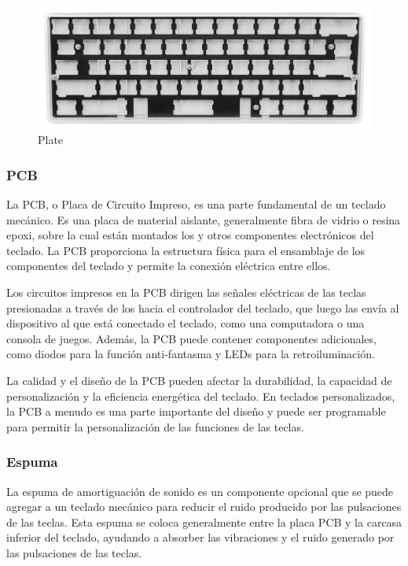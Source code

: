 \begin{figure}[H]
    \centering
    \includegraphics[width=1\textwidth]{imagenes/Capitulos/Cap03/Plate.png}
    \caption{Plate \cite{PlateImageSource}}
    \label{fig:Plate}
\end{figure}

\subsubsection{\gls{PCB}}

La \gls{PCB}, o Placa de Circuito Impreso, es una parte fundamental de un teclado mecánico. Es una placa de material aislante, generalmente fibra de vidrio o resina epoxi, sobre la cual están montados los  y otros componentes electrónicos del teclado. La \gls{PCB} proporciona la estructura física para el ensamblaje de los componentes del teclado y permite la conexión eléctrica entre ellos.

Los circuitos impresos en la \gls{PCB} dirigen las señales eléctricas de las teclas presionadas a través de los  hacia el controlador del teclado, que luego las envía al dispositivo al que está conectado el teclado, como una computadora o una consola de juegos. Además, la \gls{PCB} puede contener componentes adicionales, como diodos para la función anti-fantasma y \gls{LED}s para la retroiluminación.

La calidad y el diseño de la \gls{PCB} pueden afectar la durabilidad, la capacidad de personalización y la eficiencia energética del teclado. En teclados personalizados, la \gls{PCB} a menudo es una parte importante del diseño y puede ser programable para permitir la personalización de las funciones de las teclas.

\subsubsection{Espuma}

La espuma de amortiguación de sonido es un componente opcional que se puede agregar a un teclado mecánico para reducir el ruido producido por las pulsaciones de las teclas. Esta espuma se coloca generalmente entre la placa \gls{PCB} y la carcasa inferior del teclado, ayudando a absorber las vibraciones y el ruido generado por las pulsaciones de las teclas.

